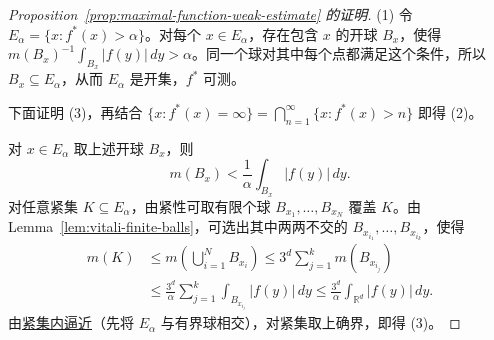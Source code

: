 \documentclass[12pt,letterpaper,twoside,openright]{ctexbook}
\theoremstyle{bluehead}
\theoremstyle{olivehead}
\theoremstyle{orangehead}
\theoremstyle{redremark}
\begin{document}
\begin{proof}[Proposition~\ref{prop:maximal-function-weak-estimate} 的证明]
(1) 令 $E_\alpha=\{x:f^*(x)>\alpha\}$。对每个 $x\in E_\alpha$，存在包含 $x$ 的开球 $B_x$，使得 $m(B_x)^{-1}\int_{B_x}|f(y)|\,dy>\alpha$。同一个球对其中每个点都满足这个条件，所以 $B_x\subseteq E_\alpha$，从而 $E_\alpha$ 是开集，$f^*$ 可测。

下面证明 (3)，再结合 $\{x:f^*(x)=\infty\}=\bigcap_{n=1}^{\infty}\{x:f^*(x)>n\}$ 即得 (2)。

对 $x\in E_\alpha$ 取上述开球 $B_x$，则
\[
m(B_x)<\frac1\alpha\int_{B_x}|f(y)|\,dy.
\]
对任意紧集 $K\subseteq E_\alpha$，由紧性可取有限个球 $B_{x_1},\ldots,B_{x_N}$ 覆盖 $K$。由 Lemma~\ref{lem:vitali-finite-balls}，可选出其中两两不交的 $B_{x_{i_1}},\ldots,B_{x_{i_k}}$，使得
\[
\begin{aligned}
m(K)&\leq m\left(\bigcup_{i=1}^N B_{x_i}\right)
\leq3^d\sum_{j=1}^k m(B_{x_{i_j}})\\
&\leq\frac{3^d}{\alpha}\sum_{j=1}^k\int_{B_{x_{i_j}}}|f(y)|\,dy
\leq\frac{3^d}{\alpha}\int_{\mathbb R^d}|f(y)|\,dy.
\end{aligned}
\]
由\hyperref[rem:lebesgue-compact-inner-approx]{紧集内逼近}（先将 $E_\alpha$ 与有界球相交），对紧集取上确界，即得 (3)。
\end{proof}
\end{document}
